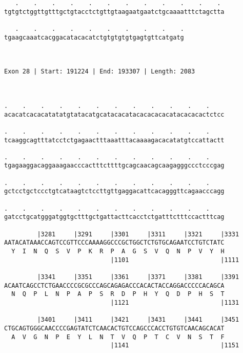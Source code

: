 \documentclass{article}
\begin{document}
\begin{Verbatim}
   .    .    .    .    .    .    .    .    .    .    .    . 
tgtgtctggttgtttgctgtacctctgttgtaagaatgaatctgcaaaatttctagctta
                                                            
   .    .    .    .    .    .    .    .    .    .
tgaagcaaatcacggacatacacatctgtgtgtgtgagtgttcatgatg
                                                 
                                                 
 
Exon 28 | Start: 191224 | End: 193307 | Length: 2083



.    .    .    .    .    .    .    .    .    .    .    .    
acacatcacacatatatgtatacatgcatacacatacacacacacatacacacactctcc
                                                            
.    .    .    .    .    .    .    .    .    .    .    .    
tcaaggcagtttatcctctgagaactttaaatttacaaaagacacatatgtccattactt
                                                            
.    .    .    .    .    .    .    .    .    .    .    .    
tgagaaggacaggaaagaacccactttcttttgcagcaacagcaagagggccctcccgag
                                                            
.    .    .    .    .    .    .    .    .    .    .    .    
gctcctgctccctgtcataagtctccttgttgaggacattcacagggttcagaacccagg
                                                            
.    .    .    .    .    .    .    .    .    .    .    .    
gatcctgcatgggatggtgctttgctgattacttcacctctgatttctttccactttcag
                                                            
         |3281     |3291     |3301     |3311     |3321     |3331
AATACATAAACCAGTCCGTTCCCAAAAGGCCCGCTGGCTCTGTGCAGAATCCTGTCTATC
  Y  I  N  Q  S  V  P  K  R  P  A  G  S  V  Q  N  P  V  Y  H
                             |1101                         |1111
  
         |3341     |3351     |3361     |3371     |3381     |3391
ACAATCAGCCTCTGAACCCCGCGCCCAGCAGAGACCCACACTACCAGGACCCCCACAGCA
  N  Q  P  L  N  P  A  P  S  R  D  P  H  Y  Q  D  P  H  S  T
                             |1121                         |1131
  
         |3401     |3411     |3421     |3431     |3441     |3451
CTGCAGTGGGCAACCCCGAGTATCTCAACACTGTCCAGCCCACCTGTGTCAACAGCACAT
  A  V  G  N  P  E  Y  L  N  T  V  Q  P  T  C  V  N  S  T  F
                             |1141                         |1151
  

\end{Verbatim}
\end{document}

